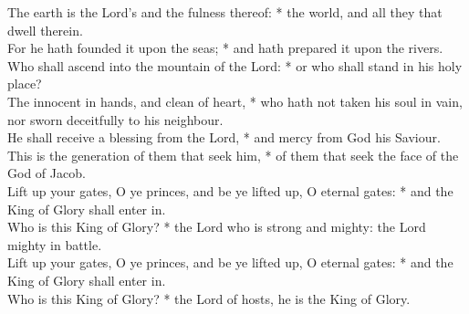 \begin{Parallel}[v]{\colw}{\colx}
{}
{\vern
{\noindent
The earth is the Lord’s and the fulness thereof: * the world, and all they that dwell therein.\\
For he hath founded it upon the seas; * and hath prepared it upon the rivers.\\
Who shall ascend into the mountain of the Lord: * or who shall stand in his holy place?\\
The innocent in hands, and clean of heart, * who hath not taken his soul in vain, nor sworn deceitfully to his neighbour.\\
He shall receive a blessing from the Lord, * and mercy from God his Saviour.\\
This is the generation of them that seek him, * of them that seek the face of the God of Jacob.\\
Lift up your gates, O ye princes, and be ye lifted up, O eternal gates: * and the King of Glory shall enter in.\\
Who is this King of Glory? * the Lord who is strong and mighty: the Lord mighty in battle.\\
Lift up your gates, O ye princes, and be ye lifted up, O eternal gates: * and the King of Glory shall enter in.\\
Who is this King of Glory? * the Lord of hosts, he is the King of Glory.}}

\end{Parallel}


